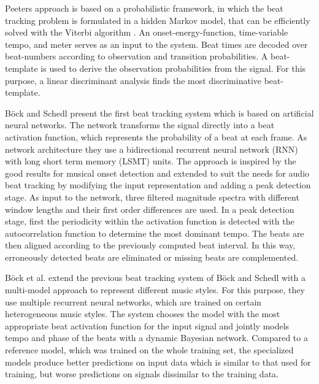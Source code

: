 \documentclass{scrartcl}
\begin{document}
Peeters \cite{Peeters2009} approach is based on a probabilistic framework, in which the beat tracking problem is formulated in a hidden Markov model, that can be efficiently solved with the Viterbi algorithm \cite{Viterbi1967}. An onset-energy-function, time-variable tempo, and meter serves as an input to the system. Beat times are decoded over beat-numbers according to observation and transition probabilities. A beat-template is used to derive the observation probabilities from the signal. For this purpose, a linear discriminant analysis finds the most discriminative beat-template. 

Böck and Schedl \cite{Boeck2011} present the first beat tracking system which is based on artificial neural networks. The network transforms the signal directly into a beat activation function, which represents the probability of a beat at each frame.  As network architecture they use a bidirectional recurrent neural network (RNN) with long short term memory (LSMT) units. The approach is inspired by the good results for musical onset detection \cite{Eyben2010} and extended to suit the needs for audio beat tracking by modifying the input representation and adding a peak detection stage. As input to the network, three filtered magnitude spectra with different window lengths and their first order differences are used. In a peak detection stage, first the periodicity within the activation function is detected with the autocorrelation function to determine the most dominant tempo. The beats are then aligned according to the previously computed beat interval. In this way, erroneously detected beats are eliminated or missing beats are complemented.

Böck et al. \cite{Boeck2014} extend the previous beat tracking system of Böck and Schedl with a multi-model approach to represent different music styles. For this purpose, they use multiple recurrent neural networks, which are trained on certain heterogeneous music styles. The system chooses the model with the most appropriate beat activation function for the input signal and jointly models tempo and phase of the beats with a dynamic Bayesian network. Compared to a reference model, which was trained on the whole training set, the specialized models produce better predictions on input data which is similar to that used for training, but worse predictions on signals dissimilar to the training data.
\end{document}
